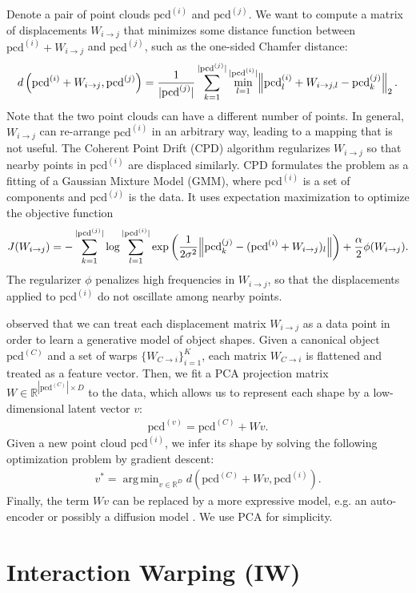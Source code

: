 \documentclass{article}
\DeclareMathOperator*{\argmin}{arg\,min}
\newcommand{\pcx}[1]{\mathrm{pcd}^{(#1)}}
\newcommand{\wxy}[2]{W_{#1 \rightarrow #2}}
\newcommand{\pci}{\pcx{i}}
\newcommand{\pcj}{\pcx{j}}
\newcommand{\pcc}{\pcx{C}}
\newcommand{\wij}{\wxy{i}{j}}
\newcommand{\wci}{\wxy{C}{i}}
\begin{document}
Denote a pair of point clouds $\pci$ and $\pcj$. We want to compute a matrix of displacements $\wij$ that minimizes some distance function between $\pci + \wij$ and $\pcj$, such as the one-sided Chamfer distance:
\begin{align}
    d\left( \pci + \wij, \pcj \right) = \frac{1}{|\pcj|} \sum_{k=1}^{|\pcj|} \min_{l=1}^{|\pci|} \norm{ \pci_l + W_{i \rightarrow j, l} - \pcj_k }_2.
\end{align}
Note that the two point clouds can have a different number of points. In general, $\wij$ can re-arrange $\pci$ in an arbitrary way, leading to a mapping that is not useful. The Coherent Point Drift (CPD) algorithm regularizes $\wij$ so that nearby points in $\pci$ are displaced similarly. CPD formulates the problem as a fitting of a Gaussian Mixture Model (GMM), where $\pci$ is a set of components and $\pcj$ is the data. It uses expectation maximization to optimize the objective function
\begin{align}
    J(\wij) = - \sum_{k=1}^{|\pcj|} \log \sum_{l=1}^{|\pci|} \exp \left( \frac{1}{2 \sigma^2} \norm{\pcj_k - (\pci + \wij)_l} \right) + \frac{\alpha}{2} \phi(\wij).
\end{align}
The regularizer $\phi$ penalizes high frequencies in $\wij$, so that the displacements applied to $\pci$ do not oscillate among nearby points.

\citet{rodriguez18transferring} observed that we can treat each displacement matrix $\wij$ as a data point in order to learn a generative model of object shapes. Given a canonical object $\pcc$ and a set of warps $\{ \wci \}_{i=1}^K$, each matrix $\wci$ is flattened and treated as a feature vector. Then, we fit a PCA projection matrix $W \in \mathbb{R}^{|\pcc|{\times}D}$ to the data, which allows us to represent each shape by a low-dimensional latent vector $v$:
\begin{align}
    \pcx{v} = \pcc + W v.
\end{align}
Given a new point cloud $\pci$, we infer its shape by solving the following optimization problem by gradient descent:
\begin{align}
    v^* = \argmin_{v \in \mathbb{R}^D} d(\pcc + W v, \pci).
\end{align}
Finally, the term $Wv$ can be replaced by a more expressive model, e.g. an auto-encoder \cite{thompson21shapebased} or possibly a diffusion model \cite{nichol22pointe}. We use PCA for simplicity.

\section{Interaction Warping (IW)}
\end{document}
